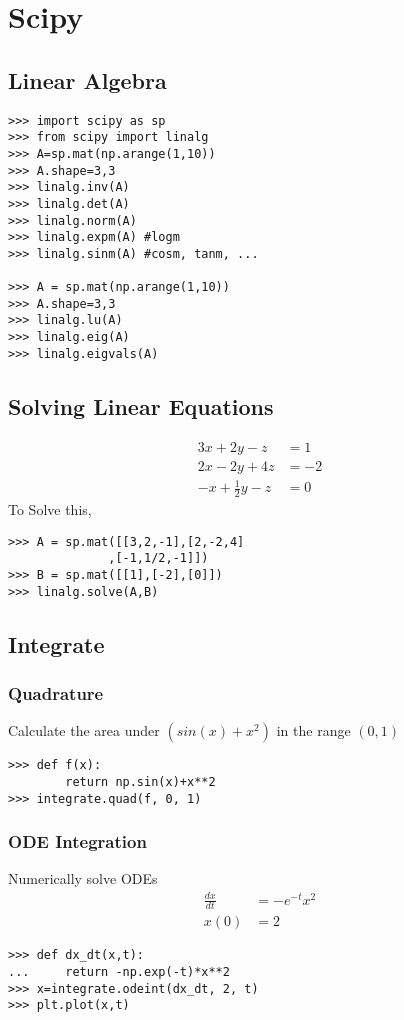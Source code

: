 \documentclass[12pt]{article}
\begin{document}
\section{Scipy}
\subsection{Linear Algebra}
\begin{verbatim}
>>> import scipy as sp
>>> from scipy import linalg
>>> A=sp.mat(np.arange(1,10))
>>> A.shape=3,3
>>> linalg.inv(A)
>>> linalg.det(A)
>>> linalg.norm(A)
>>> linalg.expm(A) #logm
>>> linalg.sinm(A) #cosm, tanm, ...

>>> A = sp.mat(np.arange(1,10))
>>> A.shape=3,3
>>> linalg.lu(A)
>>> linalg.eig(A)
>>> linalg.eigvals(A)
\end{verbatim}

\subsection{Solving Linear Equations}

\begin{align*}
  3x + 2y - z  & = 1 \\
  2x - 2y + 4z  & = -2 \\
  -x + \frac{1}{2}y -z & = 0
\end{align*}
To Solve this, 
\begin{verbatim}
>>> A = sp.mat([[3,2,-1],[2,-2,4]
              ,[-1,1/2,-1]])
>>> B = sp.mat([[1],[-2],[0]])
>>> linalg.solve(A,B)
\end{verbatim}

\subsection{Integrate}
\subsubsection{Quadrature}
Calculate the area under $(sin(x) + x^2)$ in the range $(0,1)$
\begin{verbatim}
>>> def f(x):
        return np.sin(x)+x**2
>>> integrate.quad(f, 0, 1)
\end{verbatim}

\subsubsection{ODE Integration}
Numerically solve ODEs\\
\begin{align*}
\frac{dx}{dt} &=-e^{-t}x^2\\ 
         x(0) &=2    
\end{align*}
\begin{verbatim}
>>> def dx_dt(x,t):
...     return -np.exp(-t)*x**2
>>> x=integrate.odeint(dx_dt, 2, t)
>>> plt.plot(x,t)
\end{verbatim}
\end{document}
